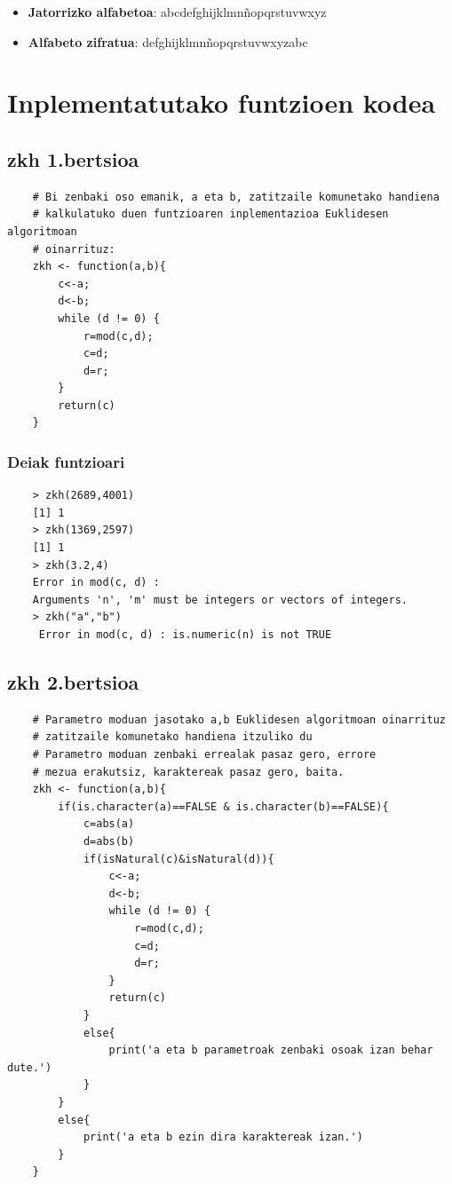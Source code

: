 \documentclass[12pt]{basque-book}
\begin{document}
\begin{itemize}
    \begin{itemize}
        \item \textbf{Jatorrizko alfabetoa}: abcdefghijklmnñopqrstuvwxyz
        \item \textbf{Alfabeto zifratua}: defghijklmnñopqrstuvwxyzabc
    \end{itemize}
\end{itemize}





\chapter{Inplementatutako funtzioen kodea}
\section{zkh 1.bertsioa}
\begin{verbatim}
    # Bi zenbaki oso emanik, a eta b, zatitzaile komunetako handiena 
    # kalkulatuko duen funtzioaren inplementazioa Euklidesen algoritmoan
    # oinarrituz:
    zkh <- function(a,b){ 
        c<-a;
        d<-b;
        while (d != 0) {
            r=mod(c,d);
            c=d;
            d=r;
        }
        return(c)  
    }
\end{verbatim}

\newpage
\subsection{Deiak funtzioari}
\begin{verbatim}
    > zkh(2689,4001)
    [1] 1
    > zkh(1369,2597)
    [1] 1
    > zkh(3.2,4)
    Error in mod(c, d) : 
    Arguments 'n', 'm' must be integers or vectors of integers. 
    > zkh("a","b")
     Error in mod(c, d) : is.numeric(n) is not TRUE 
\end{verbatim}

\newpage

\section{zkh 2.bertsioa}
\begin{verbatim}
    # Parametro moduan jasotako a,b Euklidesen algoritmoan oinarrituz
    # zatitzaile komunetako handiena itzuliko du
    # Parametro moduan zenbaki errealak pasaz gero, errore
    # mezua erakutsiz, karaktereak pasaz gero, baita.
    zkh <- function(a,b){ 
        if(is.character(a)==FALSE & is.character(b)==FALSE){
            c=abs(a)
            d=abs(b)
            if(isNatural(c)&isNatural(d)){
                c<-a;
                d<-b;
                while (d != 0) {
                    r=mod(c,d);
                    c=d;
                    d=r;
                }
                return(c)
            }
            else{
                print('a eta b parametroak zenbaki osoak izan behar dute.')
            }
        }
        else{  
            print('a eta b ezin dira karaktereak izan.')
        }
    }
\end{verbatim}
\end{document}
